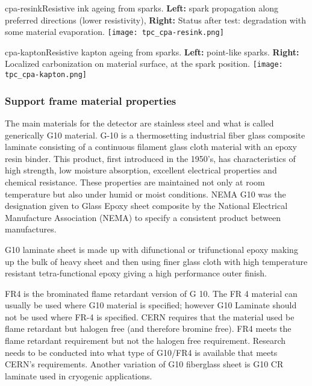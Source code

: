 \begin{cdrfigure}{cpa-resink}{Resistive ink ageing from sparks. 
 {\bf Left:} spark propagation along preferred directions (lower resistivity), {\bf Right:} Status after test: degradation with some material evaporation.} 
\texttt{[image: tpc\_cpa-resink.png]}
\end{cdrfigure}

\begin{cdrfigure}{cpa-kapton}{Resistive kapton ageing from sparks. 
 {\bf Left:} point-like sparks. {\bf Right:} Localized carbonization on material surface, at the spark position.}
\texttt{[image: tpc\_cpa-kapton.png]}
\end{cdrfigure}

\subsubsection{Support frame material properties}

The main materials for the detector are stainless steel and what is called generically G10 material.  G-10 is a thermosetting industrial fiber glass composite laminate consisting of a continuous filament glass cloth material with an epoxy resin binder. This product, first introduced in the 1950's, has characteristics of high strength, low moisture absorption, excellent electrical properties and chemical resistance. These properties are maintained not only at room temperature but also under humid or moist conditions. NEMA G10 was the designation given to Glass Epoxy sheet composite by the National Electrical Manufacture Association (NEMA) to specify a consistent product between manufactures. 

G10 laminate sheet is made up with difunctional or trifunctional epoxy making up the bulk of heavy sheet and then using finer glass cloth with high temperature resistant tetra-functional epoxy giving a high performance outer finish.

FR4 is the brominated flame retardant version of G 10. The FR 4 material can usually be used where G10 material is specified; however G10 Laminate should not be used where FR-4 is specified.  CERN requires that the material used be flame retardant but halogen free (and therefore bromine free).  FR4 meets the flame retardant requirement but not the halogen free requirement.  Research needs to be conducted into what type of G10/FR4 is available that meets CERN’s requirements.
Another variation of G10 fiberglass sheet is G10 CR laminate used in cryogenic applications. 

